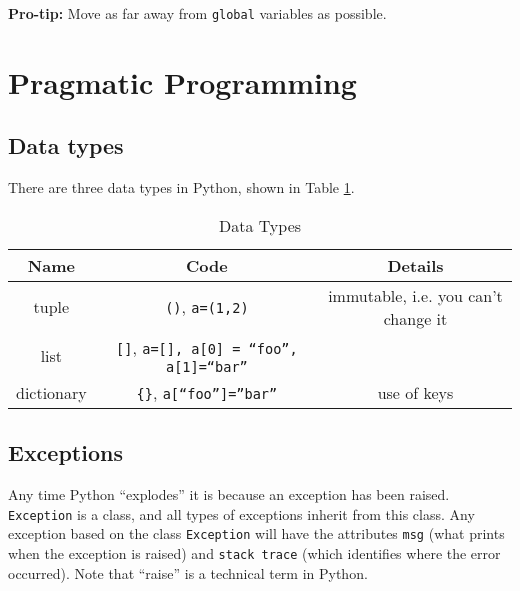 \documentclass[12pt,letter]{article}
\begin{document}
\textbf{Pro-tip:} Move as far away from \texttt{global} variables as
possible.

\newpage
\section{Pragmatic Programming}

\subsection{Data types}
There are three data types in Python, shown in Table \ref{datatypes}.

\begin{table}[h!]
\begin{center}
\caption{Data Types}
\label{datatypes}
\begin{tabular}{|c|c|c|}
\multicolumn{1}{c}{Name} & \multicolumn{1}{c}{Code} & \multicolumn{1}{c}{Details} \\
\hline
tuple & \texttt{()}, \texttt{a=(1,2)} & immutable, i.e. you can't change it \\
\hline 
list &  \texttt{[]}, \texttt{a=[], a[0] = ``foo'', a[1]=``bar''} & \\
\hline
dictionary & \texttt{\{\}}, \texttt{a[``foo'']=''bar''} & use of keys
\\
\hline
\end{tabular}
\end{center}
\end{table}


\subsection{Exceptions}

Any time Python ``explodes'' it is because an exception has been
raised. \texttt{Exception} is a class, and all types of exceptions
inherit from this class. Any exception based on the class
\texttt{Exception} will have the attributes \texttt{msg} (what prints
when the exception is raised) and
\texttt{stack trace} (which identifies where the error occurred). Note that ``raise'' is a technical term in
Python. 
\end{document}
